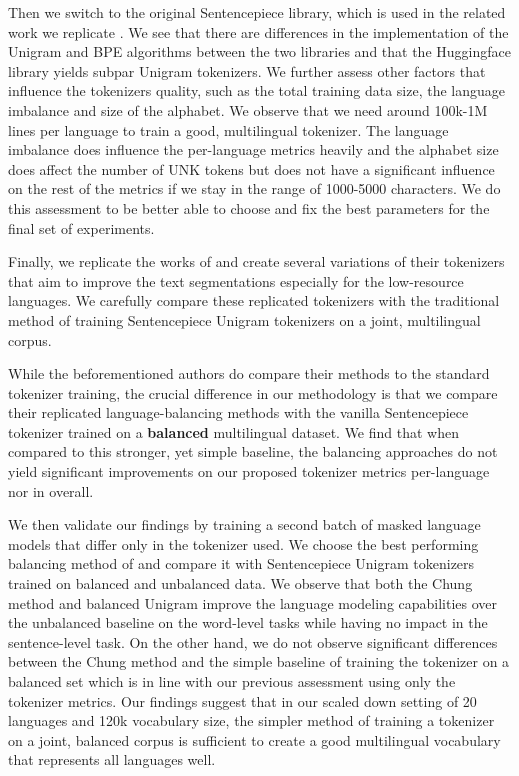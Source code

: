 Then we switch to the original Sentencepiece library, which is used in the related work we replicate \cite{conneau_unsupervised_2020,chung_improving_2020,zheng_allocating_2021,liang_xlm-v_2023}. We see that there are differences in the implementation of the Unigram and BPE algorithms between the two libraries and that the Huggingface library yields subpar Unigram tokenizers. We further assess other factors that influence the tokenizers quality, such as the total training data size, the language imbalance and size of the alphabet. We observe that we need around 100k-1M lines per language to train a good, multilingual tokenizer. The language imbalance does influence the per-language metrics heavily and the alphabet size does affect the number of UNK tokens but does not have a significant influence on the rest of the metrics if we stay in the range of 1000-5000 characters. We do this assessment to be better able to choose and fix the best parameters for the final set of experiments.

Finally, we replicate the works of \citet{chung_improving_2020,zheng_allocating_2021,liang_xlm-v_2023} and create several variations of their tokenizers that aim to improve the text segmentations especially for the low-resource languages. We carefully compare these replicated tokenizers with the traditional method of training Sentencepiece Unigram tokenizers on a joint, multilingual corpus. 

While the beforementioned authors do compare their methods to the standard tokenizer training, the crucial difference in our methodology is that we compare their replicated language-balancing methods with the vanilla Sentencepiece tokenizer trained on a \textbf{balanced} multilingual dataset. We find that when compared to this stronger, yet simple baseline, the balancing approaches do not yield significant improvements on our proposed tokenizer metrics per-language nor in overall.

We then validate our findings by training a second batch of masked language models that differ only in the tokenizer used. We choose the best performing balancing method of \citet{chung_improving_2020} and compare it with Sentencepiece Unigram tokenizers trained on balanced and unbalanced data. We observe that both the Chung method and balanced Unigram improve the language modeling capabilities over the unbalanced baseline on the word-level tasks while having no impact in the sentence-level task. On the other hand, we do not observe significant differences between the Chung method and the simple baseline of training the tokenizer on a balanced set which is in line with our previous assessment using only the tokenizer metrics. Our findings suggest that in our scaled down setting of 20 languages and 120k vocabulary size, the simpler method of training a tokenizer on a joint, balanced corpus is sufficient to create a good multilingual vocabulary that represents all languages well.

